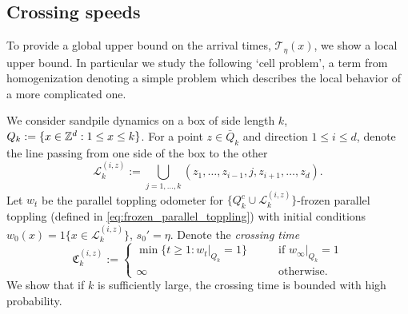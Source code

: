 \documentclass[12pt]{amsart}
\begin{document}
\subsection{Crossing speeds}
To provide a global upper bound on the arrival times, $\mathcal{T}_{\eta}(x)$, we show a local upper bound. In particular 
we study the following `cell problem', a term from homogenization denoting 
a simple problem which describes the local behavior of a more complicated one. 

We consider sandpile dynamics on a box of side length $k$, $Q_k := \{x \in \mathbb{Z}^d : 1 \leq x \leq k\}$. For a point $z \in \bar{Q}_k$ and direction $1 \leq i \leq d$, denote the line passing from one side of the
box to the other 
\begin{equation}
\mathcal{L}_k^{(i,z)} := \bigcup_{j=1,\ldots,k} (z_1, \ldots, z_{i-1}, j, z_{i+1}, \ldots, z_d).
\end{equation}
Let $w_t$ be the parallel toppling odometer for $\{Q_k^c \cup \mathcal{L}_k^{(i,z)}\}$-frozen parallel toppling (defined in \eqref{eq:frozen_parallel_toppling})
with initial conditions $w_0(x) = 1\{x \in \mathcal{L}_k^{(i,z)}\}$, $s_0' = \eta$. Denote the {\it crossing time}
\begin{equation}
\mathfrak{C}_{k}^{(i,z)} := 
\begin{cases}
\min \{ t \geq 1 : w_t|_{Q_k} = 1 \} \qquad &\mbox{if $w_{\infty} |_{Q_k} = 1$}  \\
\infty \qquad &\mbox{otherwise}.
\end{cases}
\end{equation}
We show that if $k$ is sufficiently large, the crossing time is bounded with high probability.
\end{document}
